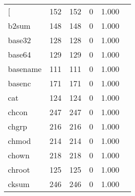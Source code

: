 \begin{longtable}{lp{2.4cm}p{2.4cm}p{2.4cm}p{2.4cm}p{2.4cm}}
\bottomrule
\endlastfoot
{[}         &                                    152 &                             152 &                                0 &                                       1.000 \\
b2sum     &                                    148 &                             148 &                                0 &                                       1.000 \\
base32    &                                    128 &                             128 &                                0 &                                       1.000 \\
base64    &                                    129 &                             129 &                                0 &                                       1.000 \\
basename  &                                    111 &                             111 &                                0 &                                       1.000 \\
basenc    &                                    171 &                             171 &                                0 &                                       1.000 \\
cat       &                                    124 &                             124 &                                0 &                                       1.000 \\
chcon     &                                    247 &                             247 &                                0 &                                       1.000 \\
chgrp     &                                    216 &                             216 &                                0 &                                       1.000 \\
chmod     &                                    214 &                             214 &                                0 &                                       1.000 \\
chown     &                                    218 &                             218 &                                0 &                                       1.000 \\
chroot    &                                    125 &                             125 &                                0 &                                       1.000 \\
cksum     &                                    246 &                             246 &                                0 &                                       1.000 \\

\end{longtable}
